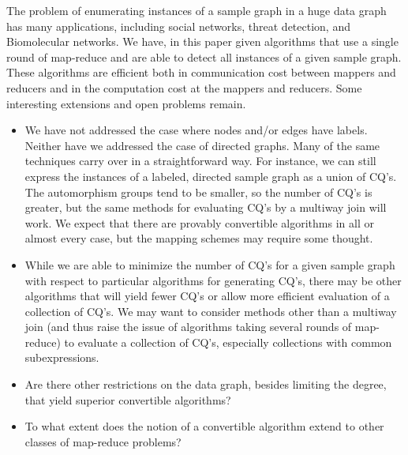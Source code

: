 The problem of enumerating instances of a sample graph in a huge data graph has many
applications, including social networks, threat detection, and Biomolecular networks.  We have, in this paper given algorithms that use a single round of map-reduce and are able to detect all instances of a given sample graph.  These algorithms are efficient both in communication cost between mappers and reducers and in the computation cost at the mappers and reducers.
Some interesting extensions and open problems remain.

\begin{itemize}

\item
We have not addressed the case where nodes and/or edges have labels.  Neither have we addressed the case of directed graphs.  Many of the same techniques carry over in a straightforward way.  For instance, we can still express the instances of a labeled, directed sample graph as a union of CQ's.  The automorphism groups tend to be smaller, so the number of CQ's is greater, but the same methods for evaluating CQ's by a multiway join will work.
We expect that there are provably convertible algorithms in all or almost every case, but the mapping schemes may require some thought.

\item
While we are able to minimize the number of CQ's for a given sample graph with respect to particular algorithms for generating CQ's, there may be other algorithms that will yield fewer CQ's or allow more efficient evaluation of a collection of CQ's.  We may want to consider methods other than a multiway join (and thus raise the issue of algorithms taking several rounds of map-reduce) to evaluate a collection of CQ's, especially collections with common subexpressions.

\item
Are there other restrictions on the data graph, besides limiting the degree, that yield superior convertible algorithms?

\item
To what extent does the notion of a convertible algorithm extend to other classes of map-reduce problems?
\end{itemize}


%